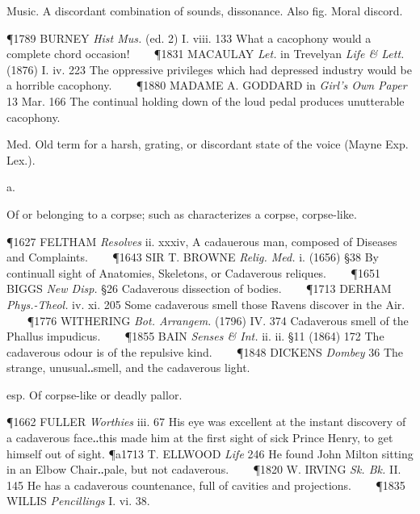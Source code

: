 \begin{description}[wide, labelwidth=!, labelindent=0pt]
\begin{myenumerate}
 Music. A discordant combination of sounds, dissonance. Also fig. Moral discord.

\P 1789 BURNEY  \textit{Hist Mus.} (ed. 2) I. viii. 133 What a cacophony would a complete chord occasion!    
\P 1831 MACAULAY  \textit{Let.} in Trevelyan \textit{Life \& Lett.} (1876) I. iv. 223 The oppressive privileges which had depressed industry would be a horrible cacophony.    
\P 1880 MADAME  A. GODDARD in \textit{Girl's Own Paper} 13 Mar. 166 The continual holding down of the loud pedal produces unutterable cacophony.

 Med. Old term for a harsh, grating, or discordant state of the voice (Mayne Exp. Lex.).
\end{myenumerate}


 a.

\noindent {}

\vspace{-0.3cm}

\begin{myenumerate}

 Of or belonging to a corpse; such as characterizes a corpse, corpse-like.

\P 1627 FELTHAM  \textit{Resolves} ii. xxxiv, A cadauerous man, composed of Diseases and Complaints.    
\P 1643 SIR T. BROWNE  \textit{Relig. Med.} i. (1656) §38 By continuall sight of Anatomies, Skeletons, or Cadaverous reliques.    
\P 1651 BIGGS  \textit{New Disp.} §26 Cadaverous dissection of bodies.    
\P 1713 DERHAM  \textit{Phys.-Theol.} iv. xi. 205 Some cadaverous smell those Ravens discover in the Air.    
\P 1776 WITHERING  \textit{Bot. Arrangem.} (1796) IV. 374 Cadaverous smell of the Phallus impudicus.    
\P 1855 BAIN  \textit{Senses \& Int.} ii. ii. §11 (1864) 172 The cadaverous odour is of the repulsive kind.    
\P 1848 DICKENS  \textit{Dombey} 36 The strange, unusual‥smell, and the cadaverous light.

 esp. Of corpse-like or deadly pallor.

\P 1662 FULLER  \textit{Worthies} iii. 67 His eye was excellent at the instant discovery of a cadaverous face‥this made him at the first sight of sick Prince Henry, to get himself out of sight.
\P a1713 T. ELLWOOD  \textit{Life} 246 He found John Milton sitting in an Elbow Chair‥pale, but not cadaverous.    
\P 1820 W. IRVING  \textit{Sk. Bk.} II. 145 He has a cadaverous countenance, full of cavities and projections.    
\P 1835 WILLIS  \textit{Pencillings} I. vi. 38.
\end{myenumerate}



\end{description}
